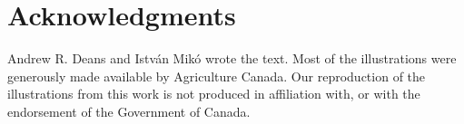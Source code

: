 \documentclass[letterpaper, 11pt]{article}
\begin{document}
\FloatBarrier

\section*{Acknowledgments}
Andrew R. Deans and Istv\'an Mik\'o wrote the text. Most of the illustrations were generously made available by Agriculture Canada. Our reproduction of the illustrations from this work is not produced in affiliation with, or with the endorsement of the Government of Canada.

\FloatBarrier


\end{document}
